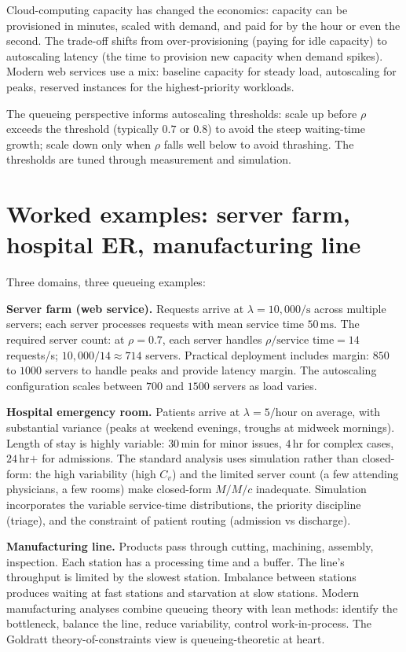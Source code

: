 Cloud-computing capacity has changed the economics: capacity can be provisioned in minutes, scaled with demand, and paid for by the hour or even the second. The trade-off shifts from over-provisioning (paying for idle capacity) to autoscaling latency (the time to provision new capacity when demand spikes). Modern web services use a mix: baseline capacity for steady load, autoscaling for peaks, reserved instances for the highest-priority workloads.

The queueing perspective informs autoscaling thresholds: scale up before $\rho$ exceeds the threshold (typically $0.7$ or $0.8$) to avoid the steep waiting-time growth; scale down only when $\rho$ falls well below to avoid thrashing. The thresholds are tuned through measurement and simulation.

\section{Worked examples: server farm, hospital ER, manufacturing line}

Three domains, three queueing examples:

\textbf{Server farm (web service).} Requests arrive at $\lambda = 10{,}000/\text{s}$ across multiple servers; each server processes requests with mean service time $50\,\text{ms}$. The required server count: at $\rho = 0.7$, each server handles $\rho/\text{service time} = 14$ requests/s; $10{,}000/14 \approx 714$ servers. Practical deployment includes margin: $850$ to $1000$ servers to handle peaks and provide latency margin. The autoscaling configuration scales between $700$ and $1500$ servers as load varies.

\textbf{Hospital emergency room.} Patients arrive at $\lambda = 5/\text{hour}$ on average, with substantial variance (peaks at weekend evenings, troughs at midweek mornings). Length of stay is highly variable: $30\,\text{min}$ for minor issues, $4\,\text{hr}$ for complex cases, $24\,\text{hr+}$ for admissions. The standard analysis uses simulation rather than closed-form: the high variability (high $C_v$) and the limited server count (a few attending physicians, a few rooms) make closed-form $M/M/c$ inadequate. Simulation incorporates the variable service-time distributions, the priority discipline (triage), and the constraint of patient routing (admission vs discharge).

\textbf{Manufacturing line.} Products pass through cutting, machining, assembly, inspection. Each station has a processing time and a buffer. The line's throughput is limited by the slowest station. Imbalance between stations produces waiting at fast stations and starvation at slow stations. Modern manufacturing analyses combine queueing theory with lean methods: identify the bottleneck, balance the line, reduce variability, control work-in-process. The Goldratt theory-of-constraints view is queueing-theoretic at heart.

